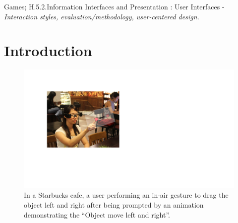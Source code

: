 \documentclass{sigchi}
\begin{document}

Games; {H.5.2.}{Information Interfaces and Presentation}
: User Interfaces - \emph{Interaction styles, evaluation/methodology, user-centered design.}



\section{Introduction}

 \begin{figure}[!h]
  \centering
  \includegraphics[width=1\columnwidth]{TopFigure2.pdf}
  \caption{In a Starbucks cafe, a user performing an in-air gesture to drag the object left and right after being prompted by an animation demonstrating the ``Object move left and right''.}
  \label{fig:TopFigure}
  \end{figure} 
\end{document}

